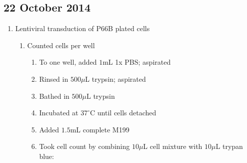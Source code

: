 \subsection*{22 October 2014}
\begin{enumerate}
	\item Lentiviral transduction of P66B plated cells
		\begin{enumerate}
			\item Counted cells per well
				\begin{enumerate}
					\item To one well, added $1$mL 1x PBS; aspirated
					\item Rinsed in $500\mu$L trypsin; aspirated
					\item Bathed in $500\mu$L trypsin
					\item Incubated at $37^{\circ}$C until cells detached
					\item Added $1.5$mL complete M199
					\item Took cell count by combining $10\mu$L cell mixture with $10\mu$L trypan blue:
			

\end{enumerate}
\end{enumerate}
\end{enumerate}
